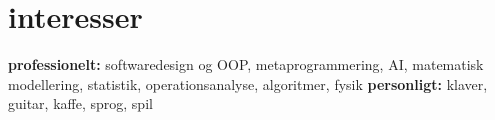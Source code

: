 \documentclass[]{../friggeri-cv} %
\begin{document}
\section{interesser}
\textbf{professionelt:} softwaredesign og OOP, metaprogrammering, AI, matematisk modellering, statistik, operationsanalyse,  algoritmer, fysik
\textbf{personligt:} klaver, guitar, kaffe, sprog, spil
%
%
%
%
%
%
%
%
%
\end{document}
